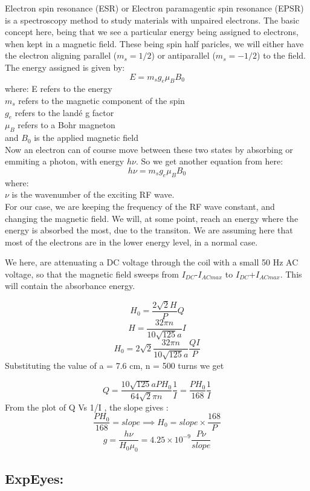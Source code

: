 \documentclass{article}
\begin{document}
Electron spin resonance (ESR) or Electron paramagentic spin resonance (EPSR) is a spectroscopy method to study materials with unpaired electrons. The basic concept here, being that we see a particular energy being assigned to electrons, when kept in a magnetic field. These being spin half paricles, we will either have the electron aligning parallel (\(m_s = 1/2\)) or antiparallel (\(m_s = -1/2\)) to the field. The energy assigned is given by:
\[ E = m_s g_e \mu_B B_0 \]
where:
E refers to the energy\\
\(m_s\) refers to the magnetic component of the spin\\
\(g_e\) refers to the landé g factor\\
\(\mu_B\) refers to a Bohr magneton\\
and \(B_0\) is the applied magnetic field\\
Now an electron can of course move between these two states by absorbing or emmiting a photon, with energy \(h\nu\). So we get another equation from here:\\
\[ h\nu=m_s g_e \mu_B B_0 \]
where:\\
\(\nu\) is the wavenumber of the exciting RF wave.\\
For our case, we are keeping the frequency of the RF wave constant, and changing the magnetic field. We will, at some point, reach an energy where the energy is absorbed the most, due to the transiton. We are assuming here that most of the electrons are in the lower energy level, in a normal case.

We here, are attenuating a DC voltage through the coil with a small 50 Hz AC voltage, so that the magnetic field sweeps from \(I_{DC}\)-\(I_{AC max}\) to \(I_{DC}\)+\(I_{AC max}\). This will contain the absorbance energy.

\[ H_0 = \frac{2\sqrt{2}H}{P}Q \]
\[ H=\frac{32\pi n}{10\sqrt{125}a}I \]
\[ H_0=2\sqrt{2}\frac{32\pi n}{10\sqrt{125}a}\frac{QI}{P} \]
Substituting the value of a = 7.6 cm, n = 500 turns we get

\begin{equation} Q=\frac{10\sqrt{125}a PH_0}{64\sqrt{2}\pi n }\frac{1}{I}=\frac{PH_0}{168}\frac{1}{I} \label{eq:desc}\end{equation}
From the plot of Q Vs 1/I , the slope gives :
\[ \frac{PH_0}{168}=slope \implies H_0=slope \times \frac{168}{P} \]
\[ g=\frac{h \nu}{H_0 \mu_0} = 4.25\times10^{-9} \frac{P \nu}{slope} \]

\subsection{ExpEyes:}
\end{document}
